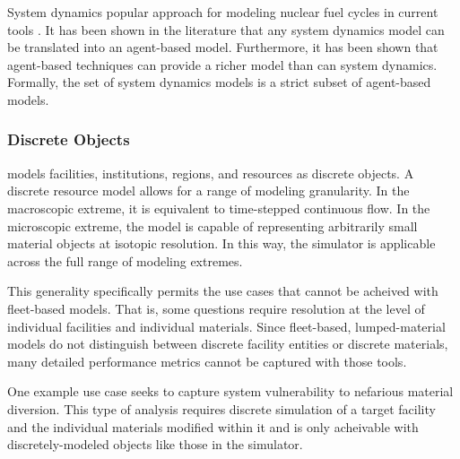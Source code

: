 System dynamics popular approach for modeling nuclear fuel cycles in current
tools \cite{VISION,CAFCA}. It has been shown in the literature
\cite{macal_agent-based_2010} that any system dynamics model can be translated
into an agent-based model. Furthermore, it has been shown that agent-based
techniques can provide a richer model than can system dynamics. Formally, the
set of system dynamics models is a strict subset of agent-based models.



\subsubsection{Discrete Objects}

\Cyclus models facilities, institutions, regions, and resources as discrete 
objects. A discrete resource model allows for a range of modeling granularity. In the
macroscopic extreme, it is equivalent to time-stepped continuous flow. In the
microscopic extreme, the model is capable of representing arbitrarily small 
material objects at isotopic resolution. In this way, the \Cyclus simulator is 
applicable across the full range of modeling extremes. 

This generality specifically permits the use cases that cannot be acheived with 
fleet-based models. That is, some questions require resolution at the level of 
individual facilities and individual materials.  Since fleet-based, 
lumped-material models do not distinguish between discrete facility entities or 
discrete materials, many detailed performance metrics cannot be captured with 
those tools. 

One example use case seeks to capture system vulnerability to nefarious 
material diversion. This type of analysis requires discrete simulation of a 
target facility and the individual materials modified within it and is only 
acheivable with discretely-modeled objects like those in the \Cyclus simulator. 

